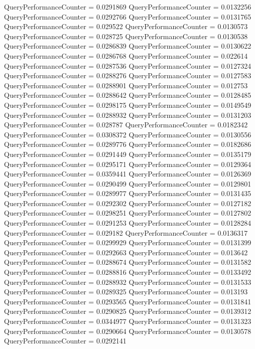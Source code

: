 \documentclass[9pt]{article}
\theoremstyle{plain}
\theoremstyle{definition}
\theoremstyle{remark}
\numberwithin{equation}{section}
\begin{document}
QueryPerformanceCounter  =  0.0291869
QueryPerformanceCounter  =  0.0132256
QueryPerformanceCounter  =  0.0292766
QueryPerformanceCounter  =  0.0131765
QueryPerformanceCounter  =  0.029522
QueryPerformanceCounter  =  0.0130573
QueryPerformanceCounter  =  0.028725
QueryPerformanceCounter  =  0.0130538
QueryPerformanceCounter  =  0.0286839
QueryPerformanceCounter  =  0.0130622
QueryPerformanceCounter  =  0.0286768
QueryPerformanceCounter  =  0.022614
QueryPerformanceCounter  =  0.0287536
QueryPerformanceCounter  =  0.0127324
QueryPerformanceCounter  =  0.0288276
QueryPerformanceCounter  =  0.0127583
QueryPerformanceCounter  =  0.0288901
QueryPerformanceCounter  =  0.012753
QueryPerformanceCounter  =  0.0288642
QueryPerformanceCounter  =  0.0128485
QueryPerformanceCounter  =  0.0298175
QueryPerformanceCounter  =  0.0149549
QueryPerformanceCounter  =  0.0288932
QueryPerformanceCounter  =  0.0131203
QueryPerformanceCounter  =  0.028787
QueryPerformanceCounter  =  0.0182342
QueryPerformanceCounter  =  0.0308372
QueryPerformanceCounter  =  0.0130556
QueryPerformanceCounter  =  0.0289776
QueryPerformanceCounter  =  0.0182686
QueryPerformanceCounter  =  0.0291449
QueryPerformanceCounter  =  0.0135179
QueryPerformanceCounter  =  0.0295171
QueryPerformanceCounter  =  0.0129364
QueryPerformanceCounter  =  0.0359441
QueryPerformanceCounter  =  0.0126369
QueryPerformanceCounter  =  0.0290499
QueryPerformanceCounter  =  0.0129801
QueryPerformanceCounter  =  0.0289977
QueryPerformanceCounter  =  0.0131435
QueryPerformanceCounter  =  0.0292302
QueryPerformanceCounter  =  0.0127182
QueryPerformanceCounter  =  0.0298251
QueryPerformanceCounter  =  0.0127802
QueryPerformanceCounter  =  0.0291253
QueryPerformanceCounter  =  0.0128284
QueryPerformanceCounter  =  0.029182
QueryPerformanceCounter  =  0.0136317
QueryPerformanceCounter  =  0.0299929
QueryPerformanceCounter  =  0.0131399
QueryPerformanceCounter  =  0.0292663
QueryPerformanceCounter  =  0.013642
QueryPerformanceCounter  =  0.0288674
QueryPerformanceCounter  =  0.0131582
QueryPerformanceCounter  =  0.0288816
QueryPerformanceCounter  =  0.0133492
QueryPerformanceCounter  =  0.0288932
QueryPerformanceCounter  =  0.0131533
QueryPerformanceCounter  =  0.0289325
QueryPerformanceCounter  =  0.013193
QueryPerformanceCounter  =  0.0293565
QueryPerformanceCounter  =  0.0131841
QueryPerformanceCounter  =  0.0290825
QueryPerformanceCounter  =  0.0139312
QueryPerformanceCounter  =  0.0344977
QueryPerformanceCounter  =  0.0131323
QueryPerformanceCounter  =  0.0290664
QueryPerformanceCounter  =  0.0130578
QueryPerformanceCounter  =  0.0292141
\end{document}
